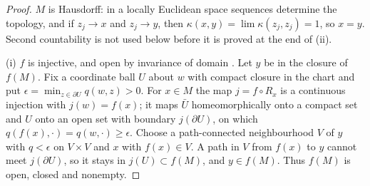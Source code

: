 \documentclass[11pt,reqno]{amsart}
\theoremstyle{definition}
\theoremstyle{remark}
\numberwithin{equation}{section}
\begin{document}
\begin{proof}
$M$ is Hausdorff: in a locally Euclidean space sequences determine the topology, and if $z_j\to x$ and $z_j\to y$, then
$\kappa(x,y)=\lim\kappa(z_j,z_j)=1$, so $x=y$.  Second countability is not used below before it is proved at the end of (ii).

(i) $f$ is injective, and open by invariance of domain \cite[Thm.~2B.3]{Hatcher}.  Let $y$ be in the closure of $f(M)$.  Fix a coordinate ball $U$
about $w$ with compact closure in the chart and put $\epsilon=\min_{z\in\partial U}q(w,z)>0$.  For $x\in M$ the map $j=f\circ R_x$ is a continuous
injection with $j(w)=f(x)$; it maps $\bar U$ homeomorphically onto a compact set and $U$ onto an open set with boundary $j(\partial U)$, on which
$q(f(x),\cdot)=q(w,\cdot)\ge\epsilon$.  Choose a path-connected neighbourhood $V$ of $y$ with $q<\epsilon$ on $V\times V$ and $x$ with $f(x)\in V$.  A path in
$V$ from $f(x)$ to $y$ cannot meet $j(\partial U)$, so it stays in $j(U)\subset f(M)$, and $y\in f(M)$.  Thus $f(M)$ is open, closed and nonempty.


\end{proof}
\end{document}
